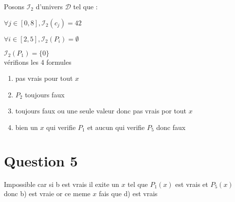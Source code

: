 \documentclass[12pt]{report}
\begin{document}
Posons $\mathcal{I}_2$ d'univers $\mathcal{D}$ tel que :

$\forall j \in [0,8] ,\mathcal{I}_2(c_j) = 42$

$\forall i \in [2,5], \mathcal{I}_2(P_i) = \emptyset$

$\mathcal{I}_2(P_1) = \lbrace 0 \rbrace$\\

vérifions les 4 formules
\begin{enumerate}
 \item  pas vrais pour tout $x$
 \item $P_2$ toujours faux
 \item toujours faux ou une seule valeur donc pas vrais por tout $x$
 \item bien un $x$ qui verifie $P_1$ et aucun qui verifie $P_5$ donc faux
\end{enumerate}

\section{Question 5}

Impossible car  si b est vrais il exite un $x$ tel que $P_1(x)$ est vrais et $P_5(x)$ donc b) est vraie or ce meme $x$ fais que d) est vrais 
\end{document}
